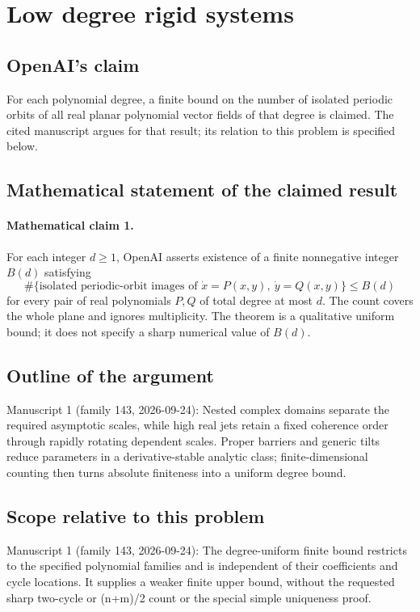 \documentclass[11pt]{article}
\begin{document}
\section*{Low degree rigid systems}

\subsection{OpenAI's claim}
For each polynomial degree, a finite bound on the number of isolated periodic orbits of all real planar polynomial vector fields of that degree is claimed. The cited manuscript argues for that result; its relation to this problem is specified below.

\subsection{Mathematical statement of the claimed result}
\paragraph{Mathematical claim 1.} For each integer $d\ge1$, OpenAI asserts existence of a finite nonnegative integer $B(d)$ satisfying
\[
\#\{\text{isolated periodic-orbit images of }\dot x=P(x,y),\ \dot y=Q(x,y)\}\le B(d)
\]
for every pair of real polynomials $P,Q$ of total degree at most $d$. The count covers the whole plane and ignores multiplicity. The theorem is a qualitative uniform bound; it does not specify a sharp numerical value of $B(d)$.

\subsection{Outline of the argument}
Manuscript 1 (family 143, 2026-09-24): Nested complex domains separate the required asymptotic scales, while high real jets retain a fixed coherence order through rapidly rotating dependent scales. Proper barriers and generic tilts reduce parameters in a derivative-stable analytic class; finite-dimensional counting then turns absolute finiteness into a uniform degree bound.

\subsection{Scope relative to this problem}
Manuscript 1 (family 143, 2026-09-24): The degree-uniform finite bound restricts to the specified polynomial families and is independent of their coefficients and cycle locations. It supplies a weaker finite upper bound, without the requested sharp two-cycle or (n+m)/2 count or the special simple uniqueness proof.
\end{document}

